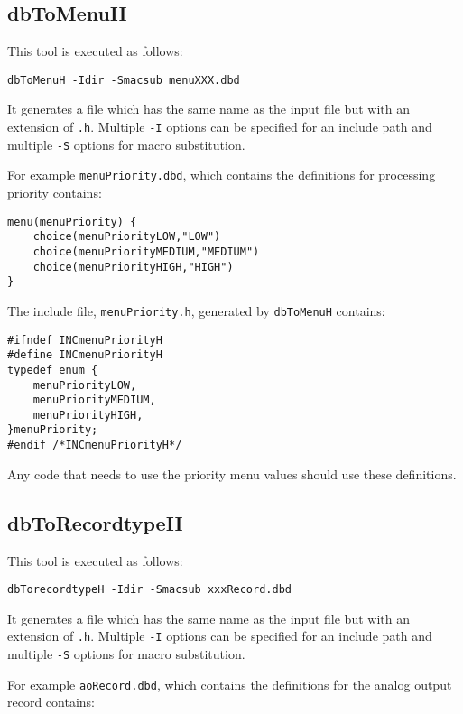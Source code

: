 \subsection{dbToMenuH}

This tool is executed as follows:

\begin{verbatim}
dbToMenuH -Idir -Smacsub menuXXX.dbd
\end{verbatim}

It generates a file which has the same name as the input file but with an extension of \verb|.h|.
Multiple \verb|-I| options can be specified for an include path and multiple \verb|-S| options for macro substitution.

For example \verb|menuPriority.dbd|, which contains the definitions for processing priority contains:

\begin{verbatim}
menu(menuPriority) {
    choice(menuPriorityLOW,"LOW")
    choice(menuPriorityMEDIUM,"MEDIUM")
    choice(menuPriorityHIGH,"HIGH")
}
\end{verbatim}

The include file, \verb|menuPriority.h|, generated by \verb|dbToMenuH| contains:

\begin{verbatim}
#ifndef INCmenuPriorityH
#define INCmenuPriorityH
typedef enum {
    menuPriorityLOW,
    menuPriorityMEDIUM,
    menuPriorityHIGH,
}menuPriority;
#endif /*INCmenuPriorityH*/

\end{verbatim}

Any code that needs to use the priority menu values should use these definitions.

\subsection{dbToRecordtypeH}

This tool is executed as follows:

\begin{verbatim}
dbTorecordtypeH -Idir -Smacsub xxxRecord.dbd
\end{verbatim}

It generates a file which has the same name as the input file but with an extension of \verb|.h|.
Multiple \verb|-I| options can be specified for an include path and multiple \verb|-S| options for macro substitution.

For example \verb|aoRecord.dbd|, which contains the definitions for the analog output record contains:

